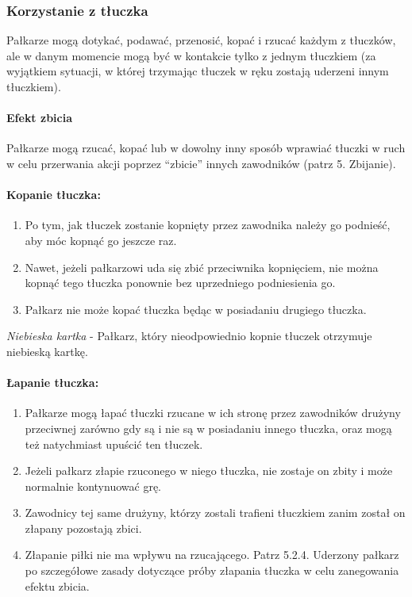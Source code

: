 \documentclass[12pt]{article}
\begin{document}
\subsubsection{Korzystanie z tłuczka}

Pałkarze mogą dotykać, podawać, przenosić, kopać i rzucać każdym z
tłuczków, ale w danym momencie mogą być w kontakcie tylko z jednym
tłuczkiem (za wyjątkiem sytuacji, w której trzymając tłuczek w ręku
zostają uderzeni innym tłuczkiem).

\paragraph{Efekt zbicia}
Pałkarze mogą rzucać, kopać lub w
dowolny inny sposób wprawiać tłuczki w ruch w celu przerwania akcji
poprzez ``zbicie'' innych zawodników (patrz 5. Zbijanie).

\paragraph{Kopanie tłuczka:}

\begin{enumerate}
\item
    Po tym, jak tłuczek zostanie kopnięty przez zawodnika należy go
  podnieść, aby móc kopnąć go jeszcze raz.
  \item
    Nawet, jeżeli pałkarzowi uda się zbić przeciwnika kopnięciem, nie
  można kopnąć tego tłuczka ponownie bez uprzedniego podniesienia go.
  \item
    Pałkarz nie może kopać tłuczka będąc w posiadaniu drugiego tłuczka.
  \end{enumerate}

\emph{Niebieska kartka} - Pałkarz, który nieodpowiednio kopnie tłuczek
otrzymuje niebieską kartkę.

\paragraph{Łapanie tłuczka:}

\begin{enumerate}
\item
    Pałkarze mogą łapać tłuczki rzucane w ich stronę przez zawodników
  drużyny przeciwnej zarówno gdy są i nie są w posiadaniu innego
  tłuczka, oraz mogą też natychmiast upuścić ten tłuczek.
  \item
    Jeżeli pałkarz złapie rzuconego w niego tłuczka, nie zostaje on zbity
  i może normalnie kontynuować grę.
  \item
    Zawodnicy tej same drużyny, którzy zostali trafieni tłuczkiem zanim
  został on złapany pozostają zbici.
  \item
    Złapanie piłki nie ma wpływu na rzucającego. Patrz 5.2.4. Uderzony
  pałkarz po szczegółowe zasady dotyczące próby złapania tłuczka w celu
  zanegowania efektu zbicia.
  \end{enumerate}
\end{document}
